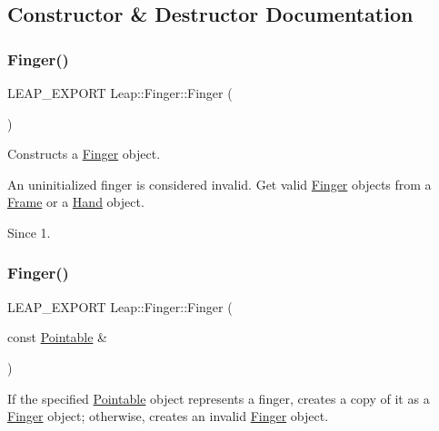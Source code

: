 \subsection{Constructor \& Destructor Documentation}
\mbox{\label{class_leap_1_1_finger_aed76c909a2904029d313538e01604c88}} 
\subsubsection{\texorpdfstring{Finger()}{Finger()}\hspace{0.1cm}{\footnotesize\ttfamily [1/2]}}
{\footnotesize\ttfamily L\+E\+A\+P\+\_\+\+E\+X\+P\+O\+RT Leap\+::\+Finger\+::\+Finger (\begin{DoxyParamCaption}{ }\end{DoxyParamCaption})}

Constructs a \hyperlink{class_leap_1_1_finger}{Finger} object.

An uninitialized finger is considered invalid. Get valid \hyperlink{class_leap_1_1_finger}{Finger} objects from a \hyperlink{class_leap_1_1_frame}{Frame} or a \hyperlink{class_leap_1_1_hand}{Hand} object. \begin{DoxySince}{Since}
1. 
\end{DoxySince}
\mbox{\label{class_leap_1_1_finger_a864d7de003b2d5b6d738c67da322e702}} 
\subsubsection{\texorpdfstring{Finger()}{Finger()}\hspace{0.1cm}{\footnotesize\ttfamily [2/2]}}
{\footnotesize\ttfamily L\+E\+A\+P\+\_\+\+E\+X\+P\+O\+RT Leap\+::\+Finger\+::\+Finger (\begin{DoxyParamCaption}\item[{const \hyperlink{class_leap_1_1_pointable}{Pointable} \&}]{ }\end{DoxyParamCaption})\hspace{0.3cm}{\ttfamily [explicit]}}

If the specified \hyperlink{class_leap_1_1_pointable}{Pointable} object represents a finger, creates a copy of it as a \hyperlink{class_leap_1_1_finger}{Finger} object; otherwise, creates an invalid \hyperlink{class_leap_1_1_finger}{Finger} object.


